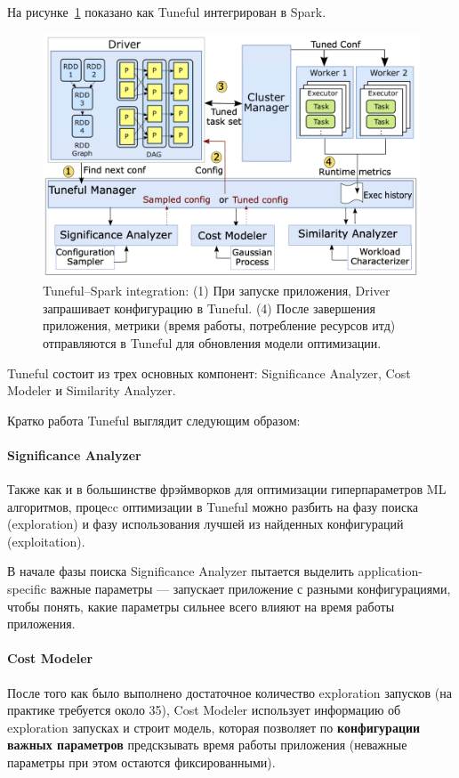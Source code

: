 На рисунке~\ref{fig:tuneful} показано как Tuneful интегрирован в Spark.

\begin{figure}[ht]
    \centering
    \includegraphics[width=0.7\linewidth]{images/tuneful.png}
    \caption{\footnotesize{Tuneful–Spark integration: (1) При запуске приложения, Driver запрашивает конфигурацию в Tuneful. (4) После завершения приложения, метрики (время работы, потребление ресурсов итд) отправляются в Tuneful для обновления модели оптимизации.}}
    \label{fig:tuneful}
\end{figure}

Tuneful состоит из трех основных компонент: Significance Analyzer, Cost Modeler и Similarity Analyzer. 

\newpage

Кратко работа Tuneful выглядит следующим образом:
\paragraph{Significance Analyzer} Также как и в большинстве фрэймворков для оптимизации гиперпараметров ML алгоритмов, процеcc оптимизации в Tuneful можно разбить на фазу поиска (exploration) и фазу использования лучшей из найденных конфигураций (exploitation).
    
В начале фазы поиска Significance Analyzer пытается выделить application-specific важные параметры --- запускает приложение с разными конфигурациями, чтобы понять, какие параметры сильнее всего влияют на время работы приложения.

\paragraph{Cost Modeler} После того как было выполнено достаточное количество exploration запусков (на практике требуется около 35), Cost Modeler использует информацию об exploration запусках и строит модель, которая позволяет по \textbf{конфигурации важных параметров} предскзывать время работы приложения (неважные параметры при этом остаются фиксированными).
    
